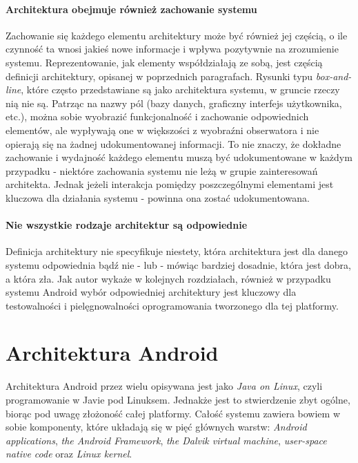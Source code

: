 \paragraph{Architektura obejmuje również zachowanie systemu}
Zachowanie się każdego elementu architektury może być również jej częścią, o ile czynność ta wnosi jakieś nowe informacje i wpływa pozytywnie na zrozumienie systemu. Reprezentowanie, jak elementy współdziałają ze sobą, jest częścią definicji architektury, opisanej w poprzednich paragrafach. Rysunki typu \textit{box-and-line}, które często przedstawiane są jako architektura systemu, w gruncie rzeczy nią nie są. Patrząc na nazwy pól (bazy danych, graficzny interfejs użytkownika, etc.), można sobie wyobrazić funkcjonalność i zachowanie odpowiednich elementów, ale wypływają one w większości z wyobraźni obserwatora i nie opierają się na żadnej udokumentowanej informacji. To nie znaczy, że dokładne zachowanie i wydajność każdego elementu muszą być udokumentowane w każdym przypadku - niektóre zachowania systemu nie leżą w grupie zainteresowań architekta. Jednak jeżeli interakcja pomiędzy poszczególnymi elementami jest kluczowa dla działania systemu - powinna ona zostać udokumentowana.

\paragraph{Nie wszystkie rodzaje architektur są odpowiednie}
Definicja architektury nie specyfikuje niestety, która architektura jest dla danego systemu odpowiednia bądź nie - lub - mówiąc bardziej dosadnie, która jest dobra, a która zła. Jak autor wykaże w kolejnych rozdziałach, również w przypadku systemu Android wybór odpowiedniej architektury jest kluczowy dla testowalności i pielęgnowalności  oprogramowania tworzonego dla tej platformy.

\section{Architektura Android}
Architektura Android przez wielu opisywana jest jako \textit{Java on Linux}, czyli programowanie w Javie pod Linuksem. Jednakże jest to stwierdzenie zbyt ogólne, biorąc pod uwagę złożoność całej platformy. Całość systemu zawiera bowiem w sobie komponenty, które układają się w pięć głównych warstw: \textit{Android applications}, \textit{the Android Framework}, \textit{the Dalvik virtual machine}, \textit{user-space native code} oraz \textit{Linux kernel}\cite{bib:hacker:handbook}.

